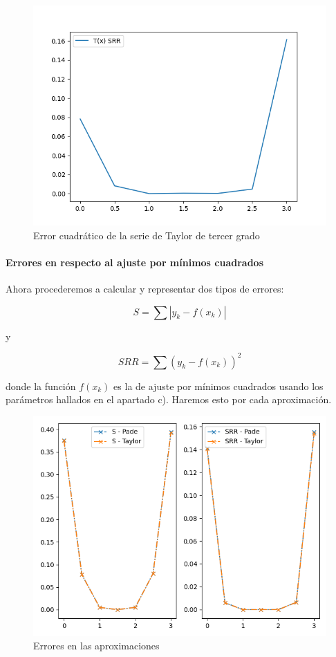 \begin{figure}[H]
	\includegraphics[width=\linewidth]{figures/taylor_quad_err.png}
	\caption{Error cuadrático de la serie de Taylor de tercer grado}
	\label{fig:taylor_3rd_deg_quad_err}
\end{figure}

\newpage 

\paragraph{Errores en respecto al ajuste por mínimos cuadrados}

Ahora procederemos a calcular y representar dos tipos de errores:

$$
S = \sum |y_k - f(x_k)|
$$

y 

$$
SRR = \sum (y_k - f(x_k))^2 
$$

donde la función $f(x_k)$ es la de ajuste por mínimos cuadrados usando los parámetros hallados en el apartado c). Haremos esto por cada aproximación.


\begin{figure}[H]
	\includegraphics[width=\linewidth]{figures/approximation_errors.png}
	\caption{Errores en las aproximaciones}
	\label{fig:approximation_errors}
\end{figure}

